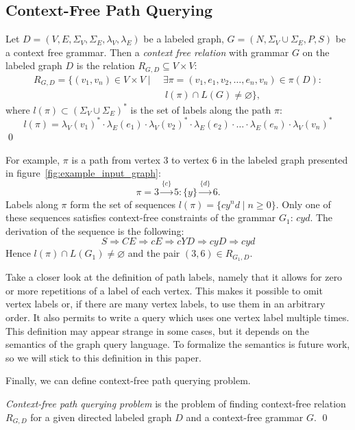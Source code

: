 \subsection{Context-Free Path Querying}

\begin{definition}
Let $D = (V, E, \Sigma_V, \Sigma_E, \lambda_V, \lambda_E)$ be a labeled graph, $G = (N, \Sigma_V \cup \Sigma_E, P, S)$ be a context free grammar. Then a \emph{context free relation} with grammar $G$ on the labeled graph $D$ is the relation $R_{G, D} \subseteq V \times V$:
\begin{equation*} \label{eq1}
\begin{split}
R_{G, D} = \{(v_1, v_n) \in V \times V  \mid \ &\exists \pi = (v_1, e_1, v_2, \ldots, e_n, v_n) \in \pi(D): \\
      &\ l(\pi) \cap L(G) \neq \varnothing \},
\end{split}
\end{equation*}
where $l(\pi) \subset (\Sigma_V \cup \Sigma_E)^*$ is the set of labels along the path $\pi$:
$$l(\pi) = \lambda_V(v_1)^* \cdot \lambda_E(e_1) \cdot \lambda_V(v_2)^* \cdot \lambda_E(e_2) \cdot \ldots \cdot \lambda_E(e_n) \cdot \lambda_V(v_n)^*$$
\qed
\end{definition}

For example, $\pi$ is a path from vertex 3 to vertex 6 in the labeled graph presented in figure~\ref{fig:example_input_graph}:
$$\pi=3 \xrightarrow{\{c\}} 5:\{y\} \xrightarrow{\{d\}} 6.$$
Labels along $\pi$ form the set of sequences $l(\pi) = \{cy^nd \mid n \geq 0\}$.
Only one of these sequences satisfies context-free constraints of the grammar $G_1$: $cyd$.
The derivation of the sequence is the following:
    $$
         S \Rightarrow CE \Rightarrow cE \Rightarrow cYD \Rightarrow cyD \Rightarrow cyd
    $$
Hence $l(\pi) \cap L(G_1) \neq \varnothing$ and the pair $(3,6) \in R_{G_1, D}$.

Take a closer look at the definition of path labels, namely that it allows for zero or more repetitions of a label of each vertex.
This makes it possible to omit vertex labels or, if there are many vertex labels, to use them in an arbitrary order.
It also permits to write a query which uses one vertex label multiple times.
This definition may appear strange in some cases, but it depends on the semantics of the graph query language.
To formalize the semantics is future work, so we will stick to this definition in this paper.

Finally, we can define context-free path querying problem.
\begin{definition}
    \emph{Context-free path querying problem} is the problem of finding context-free relation $R_{G, D}$ for a given directed labeled graph $D$ and a context-free grammar $G$. \qed
\end{definition}

